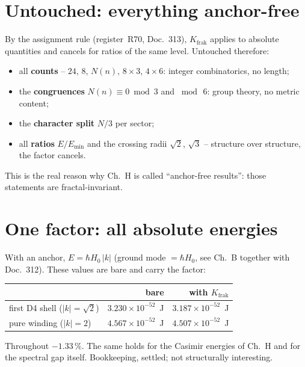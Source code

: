 \documentclass[11pt]{report}
\begin{document}
\section{Untouched: everything anchor-free}

By the assignment rule (register~R70, Doc.~313), $K_\text{frak}$
applies to absolute quantities and cancels for ratios of the same
level. Untouched therefore:

\begin{itemize}
  \item all \textbf{counts} -- $24$, $8$, $N(n)$, $8\times3$,
        $4\times6$: integer combinatorics, no length;
  \item the \textbf{congruences} $N(n)\equiv0 \bmod 3$ and
        $\bmod\,6$: group theory, no metric content;
  \item the \textbf{character split} $N/3$ per sector;
  \item all \textbf{ratios} $E/E_\text{min}$ and the crossing radii
        $\sqrt2$, $\sqrt3$ -- structure over structure, the factor
        cancels.
\end{itemize}

\noindent This is the real reason why Ch.~H is called
\enquote{anchor-free results}: those statements are
fractal-invariant.

\section{One factor: all absolute energies}

With an anchor, $E = \hbar H_0\,|k|$ (ground mode $= \hbar H_0$, see
Ch.~B together with Doc.~312). These values are bare and carry the
factor:

\begin{center}
\begin{tabular}{lrr}
\toprule
 & bare & with $K_\text{frak}$ \\
\midrule
first D4 shell ($|k| = \sqrt2$) & $3.230\times10^{-52}$~J &
  $3.187\times10^{-52}$~J \\
pure winding ($|k| = 2$) & $4.567\times10^{-52}$~J &
  $4.507\times10^{-52}$~J \\
\bottomrule
\end{tabular}
\end{center}

\noindent Throughout $-1.33\,\%$. The same holds for the Casimir
energies of Ch.~H and for the spectral gap itself. Bookkeeping,
settled; not structurally interesting.
\end{document}
